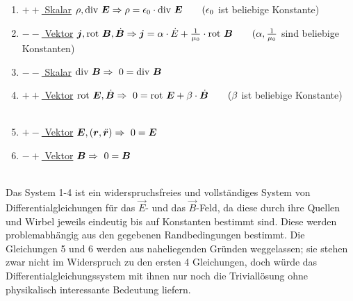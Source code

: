 \begin{enumerate}
\item
\underline{$++$ Skalar} \quad $\rho,\div \vec{E}\\
\\
\Rightarrow \rho = \epsilon_0 \cdot \div\vec{E} \qquad (\epsilon_0$  ist beliebige Konstante)

\item
\underline{$--$ Vektor} \quad $\vec{j}, \rot \vec{B},\dot{\vec{B}}\\
\\
\Rightarrow \vec{j} = \alpha\cdot\dot{E} + \frac{1}{\mu_0}\cdot\rot \vec{B}  \qquad (\alpha,\frac{1}{\mu_0}$ sind beliebige Konstanten)

\item
\underline{$--$ Skalar} \quad $\div \vec{B}\\ 
\\
\Rightarrow \ 0 = \div \vec{B}$

\item
\underline{$++$ Vektor} \quad $\rot\vec{E},\dot{\vec{B}}\\
\\
\Rightarrow \ 0 = \rot \vec{E} + \beta\cdot\dot{\vec{B}} \qquad (\beta$  ist beliebige Konstante)
\\
\\

\item
\underline{$+-$ Vektor}  \quad $\vec{E},(\vec{r},\ddot{\vec{r}})\\
\\
\Rightarrow \ 0 =  \vec{E}$

\item
\underline{$-+$ Vektor} \quad $\vec{B}\\
\\
\Rightarrow \ 0 = \vec{B}$
\end{enumerate}
\ \\

Das System 1-4 ist ein widerspruchsfreies und vollständiges System von Differentialgleichungen für das $\vec{E}$- und das $\vec{B}$-Feld, da diese durch ihre Quellen und Wirbel jeweils eindeutig bis auf Konstanten bestimmt sind. Diese werden problemabhängig aus den gegebenen Randbedingungen bestimmt. Die Gleichungen 5 und 6 werden aus naheliegenden Gründen weggelassen; sie stehen zwar nicht im Widerspruch zu den ersten 4 Gleichungen, doch würde das Differentialgleichungssystem mit ihnen nur noch die Triviallösung ohne physikalisch interessante Bedeutung liefern.\
\\
\ \\
\ \\

